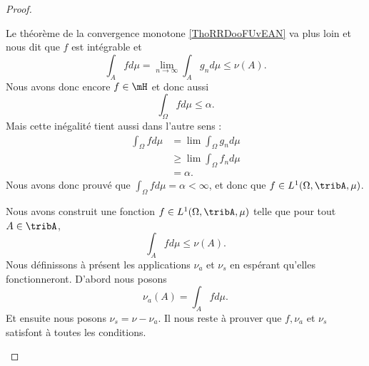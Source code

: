 \begin{proof}
\begin{subproof}
																										\spitem[\( \int_{\alpha}fd\mu=\alpha\)]

																										Le théorème de la convergence monotone \ref{ThoRRDooFUvEAN} va plus loin et nous dit que \( f\) est intégrable et
																										\begin{equation}		\label{EQooBGAOooCdaIID}
																										\int_Afd\mu=\lim_{n\to\infty }\int_Ag_nd\mu\leq \nu(A).
																										\end{equation}
																										Nous avons donc encore \( f\in\mH\) et donc aussi
																										\begin{equation}
																										\int_{\Omega}fd\mu\leq \alpha.
																										\end{equation}
																										Mais cette inégalité tient aussi dans l'autre sens :
																										\begin{subequations}
																										\begin{align}
																										\int_{\Omega}fd\mu & =\lim\int_{\Omega}g_nd\mu     \\
																											& \geq \lim\int_{\Omega}f_nd\mu \\
																											& =\alpha.
																											\end{align}
																											\end{subequations}
																											Nous avons donc prouvé que \( \int_{\Omega}fd\mu=\alpha<\infty\), et donc que \( f\in L^1(\Omega,\tribA,\mu)\).

																											Nous avons construit une fonction \( f\in L^1(\Omega,\tribA, \mu)\) telle que pour tout \( A\in\tribA\),
																											\begin{equation}
																											\int_Afd\mu\leq \nu(A).
																											\end{equation}
																											Nous définissons à présent les applications \( \nu_a\) et \( \nu_s\) en espérant qu'elles fonctionneront. D'abord nous posons
																											\begin{equation}
																											\nu_a(A)=\int_Afd\mu.
																											\end{equation}
																											Et ensuite nous posons \( \nu_s=\nu-\nu_a\). Il nous reste à prouver que \( f, \nu_a\) et \( \nu_s\) satisfont à toutes les conditions.
																											\spitem[\( \nu_a\ll \mu\)]


\end{subproof}
\end{proof}
